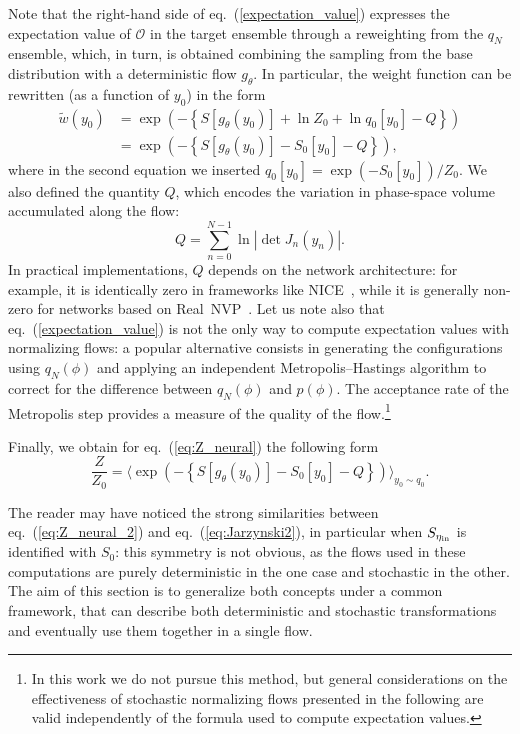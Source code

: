 \documentclass[11pt]{article}
\newcommand{\etain}{\eta_{\mbox{\tiny{in}}}}
\begin{document}
Note that the right-hand side of eq.~(\ref{expectation_value}) expresses the expectation value of $\mathcal{O}$ in the target ensemble through a reweighting from the $q_N$ ensemble, which, in turn, is obtained combining the sampling from the base distribution with a deterministic flow $g_\theta$. In particular, the weight function can be rewritten (as a function of $y_0$) in the form 
\begin{align}
\tilde{w}(y_0) 
&= \exp\left( - \left\{ S[g_\theta(y_0)] + \ln Z_0 + \ln q_0[y_0] - Q\right\} \right) \nonumber \\
&= \exp\left( - \left\{ S[g_\theta(y_0)] - S_0[y_0] - Q\right\} \right),
\label{eq:tilde_w_2}
\end{align}
where in the second equation we inserted $q_0[y_0] = \exp\left(-S_0[y_0]\right)/Z_0$. We also defined the quantity $Q$, which encodes the variation in phase-space volume accumulated along the flow:
\begin{equation}
\label{eq:Q_deterministic}
Q=\sum_{n=0}^{N-1} \ln \left| \det J_n (y_n) \right| .
\end{equation}
In practical implementations, $Q$ depends on the network architecture: for example, it is identically zero in frameworks like NICE~\cite{Dinh:2014nni}, while it is generally non-zero for networks based on Real~NVP~\cite{Dinh:2016deu}. Let us note also that eq.~(\ref{expectation_value}) is not the only way to compute expectation values with normalizing flows: a popular alternative consists in generating the configurations using $q_N(\phi)$ and applying an independent Metropolis--Hastings algorithm to correct for the difference between $q_N(\phi)$ and $p(\phi)$. The acceptance rate of the Metropolis step provides a measure of the quality of the flow.\footnote{In this work we do not pursue this method, but general considerations on the effectiveness of stochastic normalizing flows presented in the following are valid independently of the formula used to compute expectation values.}

Finally, we obtain for eq.~(\ref{eq:Z_neural}) the following form
\begin{equation}
\label{eq:Z_neural_2}
 \frac{Z}{Z_0} = \langle \exp \left( - \left\{ S[g_\theta(y_0)] - S_0[y_0] - Q \right\} \right) \rangle_{y_0 \sim q_0}.
\end{equation}

The reader may have noticed the strong similarities between eq.~(\ref{eq:Z_neural_2}) and eq.~(\ref{eq:Jarzynski2}), in particular when $S_{\etain} $ is identified with $S_0$: this symmetry is not obvious, as the flows used in these computations are purely deterministic in the one case and stochastic in the other. The aim of this section is to generalize both concepts under a common framework, that can describe both deterministic and stochastic transformations and eventually use them together in a single flow.
\end{document}
